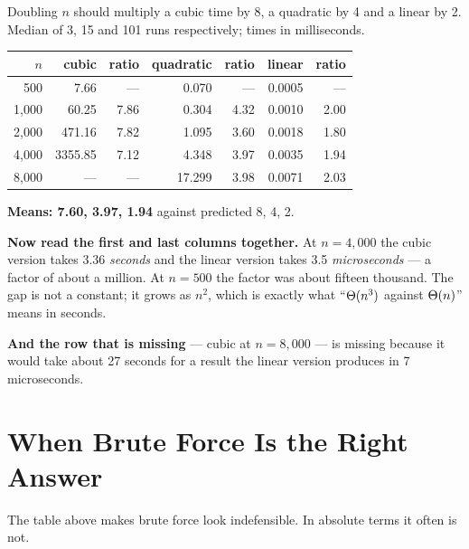 \begin{worked}
Doubling $n$ should multiply a cubic time by 8, a quadratic by 4 and a linear
by 2. Median of 3, 15 and 101 runs respectively; times in milliseconds.

\begin{center}
\begin{tabular}{@{}rrrrrrr@{}}
\toprule
\rowcolor{primary!15}
$n$ & cubic & ratio & quadratic & ratio & linear & ratio \\
\midrule
   500 &    7.66 & ---  & 0.070 & ---  & 0.0005 & ---  \\
1{,}000 &   60.25 & 7.86 & 0.304 & 4.32 & 0.0010 & 2.00 \\
2{,}000 &  471.16 & 7.82 & 1.095 & 3.60 & 0.0018 & 1.80 \\
4{,}000 & 3355.85 & 7.12 & 4.348 & 3.97 & 0.0035 & 1.94 \\
8{,}000 & ---     & ---  & 17.299 & 3.98 & 0.0071 & 2.03 \\
\bottomrule
\end{tabular}
\end{center}

\smallskip
\textbf{Means: 7.60, 3.97, 1.94} against predicted 8, 4, 2.

\smallskip
\textbf{Now read the first and last columns together.} At $n = 4{,}000$ the
cubic version takes 3.36 \emph{seconds} and the linear version takes 3.5
\emph{microseconds} --- a factor of about a million. At $n = 500$ the factor was
about fifteen thousand. The gap is not a constant; it grows as $n^{2}$, which
is exactly what ``$\Theta(n^{3})$ against $\Theta(n)$'' means in seconds.

\smallskip
\textbf{And the row that is missing} --- cubic at $n = 8{,}000$ --- is missing
because it would take about 27 seconds for a result the linear version produces
in 7 microseconds.
\end{worked}

\section{When Brute Force Is the Right Answer}

The table above makes brute force look indefensible. In absolute terms it often
is not.

